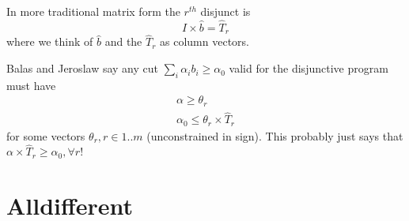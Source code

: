 \documentclass{article}
\newcommand{\ignore}[1]{}
\begin{document}
In more traditional matrix form the $r^{th}$
disjunct
is
$$
I \times \hat{b} = \hat{T}_r 
$$
where we think of $\hat{b}$ and the $\hat{T}_r$ as column vectors. 
\ignore{
To get a $\geq$ form lets rewrite this to
$$
\left[ \begin{array}{c} I \\ -I 
\end{array} \right] 
\times \hat{b} \geq 
\left[ \begin{array}{c} \hat{T}_r \\ -\hat{T}_r 
\end{array} \right]
$$

Denote by $II$ the stacked array $I$ above $-I$.
Similarly denote by $TT_r$ the column 
$\left[ \begin{array}{c} \hat{T}_r \\ -\hat{T}_r 
\end{array} \right]$.

Balas and Jeroslaw say any cut 
$\sum_{i} \alpha_i b_i \geq \alpha_0$
valid for the disjunctive program
must have
$$
\begin{array}{rl}
\alpha_j \geq \max_r \theta_r \times II_j, & j \in 1..n \\
\alpha_0 \leq \min_r \theta_r \times TT_r
\end{array}
$$
for some vectors $\theta_r \geq 0, r \in 1..m$
(in our case each of size $2n$.

Now since $II_j$ is 0 except at row $j$ (1) and row $j+n$ (-1). The conditions simplify to
$$
\begin{array}{rl}
\alpha_j \geq \max_r \theta_{r,j} - \theta_{r,n+j}, & j \in 1..n \\
\alpha_0 \leq \min_r \theta_r \times TT_r
\end{array}
$$
}

Balas and Jeroslaw say any cut 
$\sum_{i} \alpha_i b_i \geq \alpha_0$
valid for the disjunctive program
must have
$$
\begin{array}{rl}
\alpha \geq \theta_r \\
\alpha_0 \leq \theta_r \times \hat{T}_r
\end{array}
$$
for some vectors $\theta_r, r \in 1..m$ (unconstrained in sign).
This probably just says that 
$\alpha \times \hat{T}_r \geq \alpha_0, \forall r$!


\section{Alldifferent}
\end{document}
